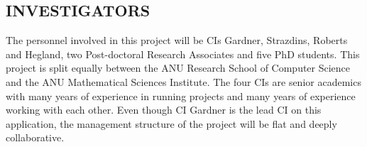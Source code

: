 \iffalse
\subsection*{ROLE OF PERSONNEL}
\fi
\subsection*{INVESTIGATORS}


%


The personnel involved in this project will be CIs Gardner, Strazdins,
Roberts and Hegland, two Post-doctoral Research Associates and five
PhD students. This project is split equally between the ANU Research
School of Computer Science and the ANU Mathematical Sciences
Institute. The four CIs are senior academics with many years of
experience in running projects and many years of experience working
with each other. Even though CI Gardner is the lead CI on this 
application, the management structure of the project will be flat and
deeply collaborative.


